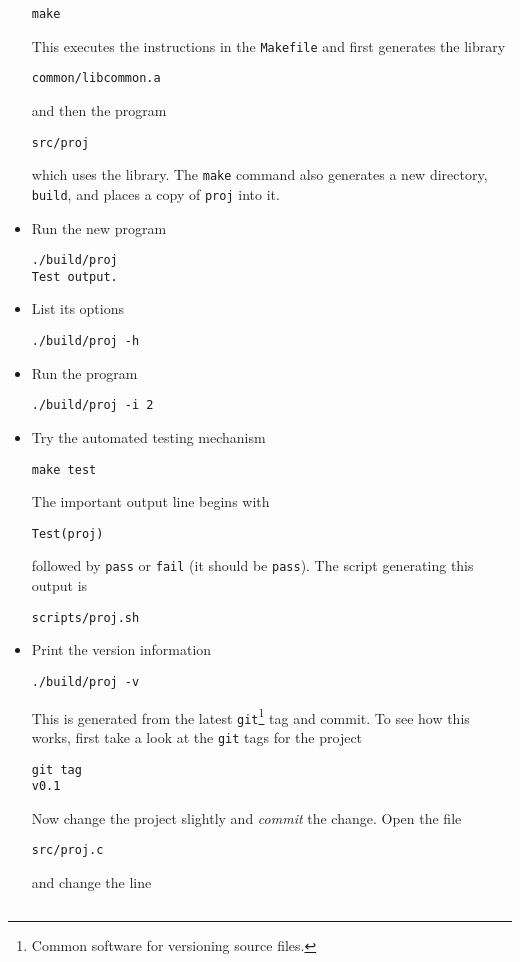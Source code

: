 \documentclass[a4paper, english]{article}
\begin{document}
\begin{itemize}
\begin{verbatim}
make
\end{verbatim}
This executes the instructions in the \texttt{Makefile} and first generates
the library
\begin{verbatim}
common/libcommon.a
\end{verbatim}
and then the program
\begin{verbatim}
src/proj
\end{verbatim}
which uses the library. The \texttt{make} command also generates a new
directory, \texttt{build}, and places a copy of \texttt{proj} into it.
\item Run the new program
\begin{verbatim}
./build/proj 
Test output.
\end{verbatim}
\item List its options
\begin{verbatim}
./build/proj -h
\end{verbatim}
\item Run the program
\begin{verbatim}
./build/proj -i 2
\end{verbatim}
\item Try the automated testing mechanism
\begin{verbatim}
make test
\end{verbatim}
The important output line begins with
\begin{verbatim}
Test(proj)
\end{verbatim}
followed by \texttt{pass} or \texttt{fail} (it should be
\texttt{pass}). The script generating this output is
\begin{verbatim}
scripts/proj.sh
\end{verbatim}
\item Print the version information
\begin{verbatim}
./build/proj -v
\end{verbatim}
This is generated from the latest \texttt{git}\footnote{Common
  software for versioning source files.} tag and commit. To see
how this works, first take a look at the \texttt{git} tags for the
project
\begin{verbatim}
git tag
v0.1
\end{verbatim}
Now change the project slightly and \textit{commit} the change. 
Open the file
\begin{verbatim}
src/proj.c
\end{verbatim}
and change the line
\begin{verbatim}

\end{verbatim}
\end{itemize}
\end{document}
